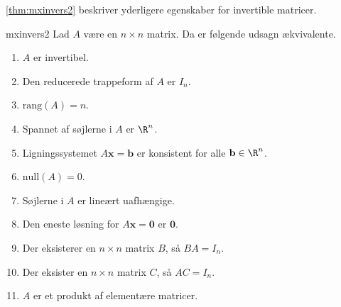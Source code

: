 \ref{thm:mxinvers2} beskriver yderligere egenskaber for invertible matricer. 
%
\begin{thm}{}{mxinvers2}
Lad $A$ være en $n \times n$ matrix. 
Da er følgende udsagn ækvivalente.
\begin{enumerate}[label=(\alph*)]
\item $A$ er invertibel.
\item Den reducerede trappeform af $A$ er $I_n$.
\item $\text{rang}(A)=n$.
\item Spannet af søjlerne i $A$ er $\R^n$.
\item Ligningssystemet $A\textbf{x}=\textbf{b}$ er konsistent for alle $\textbf{b} \in \R^n$.
\item $\text{null}(A)=0$.
\item Søjlerne i $A$ er lineært uafhængige.
\item Den eneste løsning for $A\textbf{x}=\textbf{0}$ er $\textbf{0}$.
\item Der eksisterer en $n \times n$ matrix $B$, så $BA=I_n$.
\item Der eksister en $n \times n$ matrix $C$, så $AC=I_n$.
\item $A$ er et produkt af elementære matricer.
\end{enumerate}
\end{thm}
